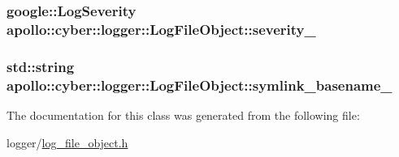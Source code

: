 \hypertarget{classapollo_1_1cyber_1_1logger_1_1LogFileObject_a55b503945f312ba3315099707efee8c4}{
\subsubsection[{severity\-\_\-}]{\setlength{\rightskip}{0pt plus 5cm}google\-::\-Log\-Severity apollo\-::cyber\-::logger\-::\-Log\-File\-Object\-::severity\-\_\-\hspace{0.3cm}{\ttfamily [private]}}}\label{classapollo_1_1cyber_1_1logger_1_1LogFileObject_a55b503945f312ba3315099707efee8c4}
\hypertarget{classapollo_1_1cyber_1_1logger_1_1LogFileObject_a5eab9f067f8b03af6d6fad057e85d063}{
\subsubsection[{symlink\-\_\-basename\-\_\-}]{\setlength{\rightskip}{0pt plus 5cm}std\-::string apollo\-::cyber\-::logger\-::\-Log\-File\-Object\-::symlink\-\_\-basename\-\_\-\hspace{0.3cm}{\ttfamily [private]}}}\label{classapollo_1_1cyber_1_1logger_1_1LogFileObject_a5eab9f067f8b03af6d6fad057e85d063}


The documentation for this class was generated from the following file\-:\begin{DoxyCompactItemize}
\item 
logger/\hyperlink{log__file__object_8h}{log\-\_\-file\-\_\-object.\-h}\end{DoxyCompactItemize}
